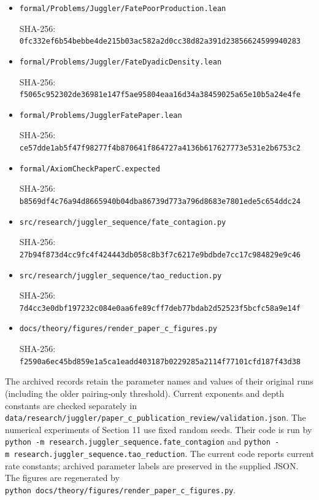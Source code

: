 \documentclass[11pt,a4paper]{article}
\begin{document}
\begin{itemize}
  SHA-256:
  \texttt{\nolinkurl{773c579e2ba303dc49f1488020ea142b0b35ea26573707ebfd6afca7c4dd284b}}
\item
  \texttt{\nolinkurl{formal/Problems/Juggler/FatePoorProduction.lean}}

  SHA-256:
  \texttt{\nolinkurl{0fc332ef6b54bebbe4de215b03ac582a2d0cc38d82a391d23856624599940283}}
\item
  \texttt{\nolinkurl{formal/Problems/Juggler/FateDyadicDensity.lean}}

  SHA-256:
  \texttt{\nolinkurl{f5065c952302de36981e147f5ae95804eaa16d34a38459025a65e10b5a24e4fe}}
\item
  \texttt{\nolinkurl{formal/Problems/JugglerFatePaper.lean}}

  SHA-256:
  \texttt{\nolinkurl{ce57dde1ab5f47f98277f4b870641f864727a4136b617627773e531e2b6753c2}}
\item
  \texttt{\nolinkurl{formal/AxiomCheckPaperC.expected}}

  SHA-256:
  \texttt{\nolinkurl{b8569df4c76a94d8665940b04dba86739d773a796d8683e7801ede5c654ddc24}}
\item
  \texttt{\nolinkurl{src/research/juggler_sequence/fate_contagion.py}}

  SHA-256:
  \texttt{\nolinkurl{27b94f873d4cc9fc4f424443db058c8b3f7c6217e9bdbde7cc17c984829e9c46}}
\item
  \texttt{\nolinkurl{src/research/juggler_sequence/tao_reduction.py}}

  SHA-256:
  \texttt{\nolinkurl{7d4cc3e0dbf197232c084e0aa6fe89cff7deb77bdab2d52523f5bcfc58a9e14f}}
\item
  \texttt{\nolinkurl{docs/theory/figures/render_paper_c_figures.py}}

  SHA-256:
  \texttt{\nolinkurl{f2590a6ec45bd859e1a5ca1eadd403187b0229285a2114f77101cfd187f43d38}}
\end{itemize}

The archived records retain the parameter names and values of their
original runs (including the older pairing-only threshold). Current
exponents and depth constants are checked separately in
\texttt{\nolinkurl{data/research/juggler/paper_c_publication_review/validation.json}}.
The numerical experiments of Section 11 use fixed random seeds. Their
code is run by
\texttt{python\ -m\ research.juggler\_sequence.fate\_contagion} and
\texttt{python\ -m\ research.juggler\_sequence.tao\_reduction}. The
current code reports current rate constants; archived parameter labels
are preserved in the supplied JSON. The figures are regenerated by
\texttt{python\ docs/theory/figures/render\_paper\_c\_figures.py}.
\end{document}
